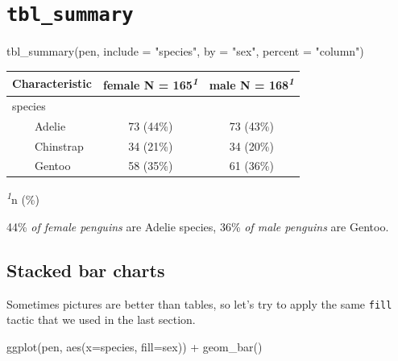 \documentclass[
  letterpaper,
  DIV=11,
  numbers=noendperiod,
  oneside]{scrreprt}
\newenvironment{Shaded}{\begin{snugshade}}{\end{snugshade}}
\newcommand{\AttributeTok}[1]{\textcolor[rgb]{0.40,0.45,0.13}{#1}}
\newcommand{\FunctionTok}[1]{\textcolor[rgb]{0.28,0.35,0.67}{#1}}
\newcommand{\NormalTok}[1]{\textcolor[rgb]{0.00,0.23,0.31}{#1}}
\newcommand{\SpecialCharTok}[1]{\textcolor[rgb]{0.37,0.37,0.37}{#1}}
\newcommand{\StringTok}[1]{\textcolor[rgb]{0.13,0.47,0.30}{#1}}
\begin{document}
\section{\texorpdfstring{\texttt{tbl\_summary}}{tbl\_summary}}

\begin{Shaded}
\begin{Highlighting}[]
\FunctionTok{tbl\_summary}\NormalTok{(pen, }\AttributeTok{include =} \StringTok{"species"}\NormalTok{, }\AttributeTok{by =} \StringTok{"sex"}\NormalTok{, }\AttributeTok{percent =} \StringTok{"column"}\NormalTok{)}
\end{Highlighting}
\end{Shaded}

\begin{table}
\fontsize{12.0pt}{14.4pt}\selectfont
\begin{tabular*}{\linewidth}{@{\extracolsep{\fill}}lcc}
\toprule
\textbf{Characteristic} & \textbf{female}  N = 165\textsuperscript{\textit{1}} & \textbf{male}  N = 168\textsuperscript{\textit{1}} \\ 
\midrule\addlinespace[2.5pt]
species &  &  \\ 
    Adelie & 73 (44\%) & 73 (43\%) \\ 
    Chinstrap & 34 (21\%) & 34 (20\%) \\ 
    Gentoo & 58 (35\%) & 61 (36\%) \\ 
\bottomrule
\end{tabular*}
\begin{minipage}{\linewidth}
\textsuperscript{\textit{1}}n (\%)\\
\end{minipage}
\end{table}

44\% \emph{of female penguins} are Adelie species, 36\% \emph{of male
penguins} are Gentoo.

\subsection{Stacked bar charts}\label{stacked-bar-charts}

Sometimes pictures are better than tables, so let's try to apply the
same \texttt{fill} tactic that we used in the last section.

\begin{Shaded}
\begin{Highlighting}[]
\FunctionTok{ggplot}\NormalTok{(pen, }\FunctionTok{aes}\NormalTok{(}\AttributeTok{x=}\NormalTok{species, }\AttributeTok{fill=}\NormalTok{sex)) }\SpecialCharTok{+} \FunctionTok{geom\_bar}\NormalTok{()}
\end{Highlighting}
\end{Shaded}
\end{document}
